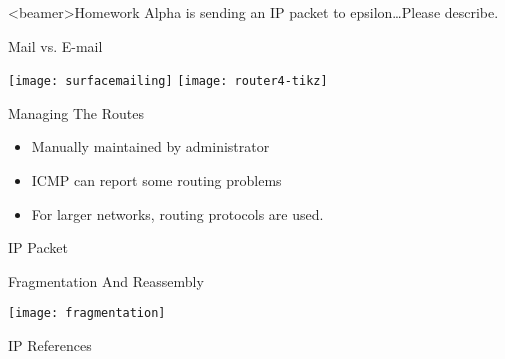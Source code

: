 \begin{frame}<beamer>{Homework}
  Alpha is sending an IP packet to epsilon\ldots{}Please describe.
\end{frame}

\begin{frame}{Mail vs. E-mail}
  \begin{center}
    \texttt{[image: surfacemailing]}\hfill
    \texttt{[image: router4-tikz]}
  \end{center}
\end{frame}

\begin{frame}{Managing The Routes}
  \begin{itemize}
  \item Manually maintained by administrator
  \item ICMP can report some routing problems
  \item For larger networks, routing protocols are used.
  \end{itemize}
\end{frame}

\begin{frame}{IP Packet}
  \begin{center}
  \end{center}
\end{frame}

\begin{frame}{Fragmentation And Reassembly}
  \begin{center}
    \texttt{[image: fragmentation]}
  \end{center}
\end{frame}

\begin{frame}{IP References}
  \begin{refsection}
    \nocite{wiki:ip, wiki:ipaddr, rfc791, wiki:ipv4hdrchksum} \printbibliography[heading=none]
  \end{refsection}
\end{frame}


